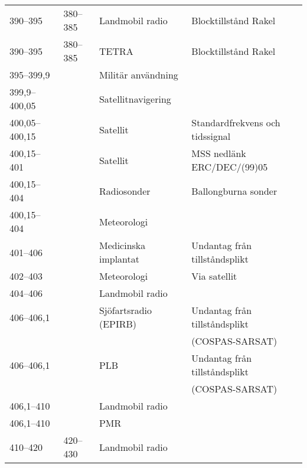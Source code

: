 \begin{landscape}
\begin{landscape}
\begin{longtable}{llll}
	390--395           & 380--385           & Landmobil radio         & Blocktillstånd Rakel                  \\
	390--395           & 380--385           & TETRA                   & Blocktillstånd Rakel                  \\
	395--399,9         &                    & Militär användning      &                                       \\
	399,9--400,05      &                    & Satellitnavigering      &                                       \\
	400,05--400,15     &                    & Satellit                & Standardfrekvens och tidssignal       \\
	400,15--401        &                    & Satellit                & MSS nedlänk ERC/DEC/(99)05            \\
	400,15--404        &                    & Radiosonder             & Ballongburna sonder                   \\
	400,15--404        &                    & Meteorologi             &                                       \\
	401--406           &                    & Medicinska implantat    & Undantag från tillståndsplikt         \\
	402--403           &                    & Meteorologi             & Via satellit                          \\
	404--406           &                    & Landmobil radio         &                                       \\
	406--406,1         &                    & Sjöfartsradio (EPIRB)   & Undantag från tillståndsplikt         \\
	                   &                    &                         & (COSPAS-SARSAT)                       \\
	406--406,1         &                    & PLB                     & Undantag från tillståndsplikt         \\
	                   &                    &                         & (COSPAS-SARSAT)                       \\
	406,1--410         &                    & Landmobil radio         &                                       \\
	406,1--410         &                    & PMR                     &                                       \\
	410--420           & 420--430           & Landmobil radio         &                                       \\

\end{longtable}
\end{landscape}
\end{landscape}
